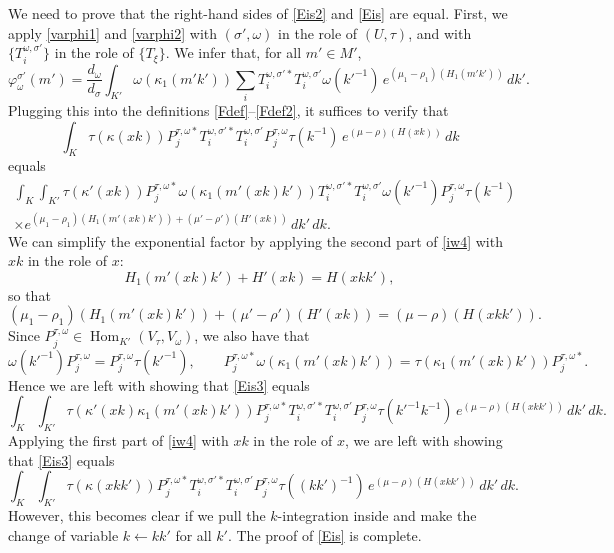 \documentclass[11pt,oneside]{amsart}
\numberwithin{equation}{section}
\theoremstyle{remark}
\theoremstyle{plain}
\DeclareMathOperator{\Hom}{Hom}
\begin{document}
We need to prove that the right-hand sides of \eqref{Eis2} and \eqref{Eis} are equal. First, we apply \eqref{varphi1} and \eqref{varphi2} with $(\sigma',\omega)$ in the role of $(U,\tau)$, and with $\{T_i^{\omega,\sigma'}\}$ in the role of $\{T_\xi\}$. We infer that, for all $m'\in M'$,
\[\varphi_\omega^{\sigma'}(m')=\frac{d_\omega}{d_\sigma}\int_{K'}\omega(\kappa_1(m'k'))
\sum_i T_i^{\omega,\sigma'*}T_i^{\omega,\sigma'}\omega(k'^{-1})\,e^{(\mu_1-\rho_1)(H_1(m'k'))}\,dk'.\]
Plugging this into the definitions \eqref{Fdef}--\eqref{Fdef2}, it suffices to verify that
\begin{equation}\label{Eis3}
\int_K\tau(\kappa(xk))P_j^{\tau,\omega*}T_i^{\omega,\sigma'*}T_i^{\omega,\sigma'}P_j^{\tau,\omega}
\tau(k^{-1})\,e^{(\mu-\rho)(H(xk))}\,dk
\end{equation}
equals
\begin{multline*}\int_K\int_{K'}\tau(\kappa'(xk))P_j^{\tau,\omega*}\omega(\kappa_1(m'(xk)k'))T_i^{\omega,\sigma'*}T_i^{\omega,\sigma'}
\omega(k'^{-1})P_j^{\tau,\omega}\tau(k^{-1})\\
\times e^{(\mu_1-\rho_1)(H_1(m'(xk)k'))+(\mu'-\rho')(H'(xk))}\,dk'\,dk.
\end{multline*}
We can simplify the exponential factor by applying the second part of \eqref{iw4} with $xk$ in the role of $x$:
\[H_1(m'(xk)k')+H'(xk)=H(xkk'),\]
so that
\[(\mu_1-\rho_1)(H_1(m'(xk)k'))+(\mu'-\rho')(H'(xk))=(\mu-\rho)(H(xkk')).\]
Since $P_j^{\tau,\omega}\in\Hom_{K'}(V_\tau,V_\omega)$, we also have that
\[\omega(k'^{-1})P_j^{\tau,\omega}=P_j^{\tau,\omega}\tau(k'^{-1}),\qquad
P_j^{\tau,\omega*}\omega(\kappa_1(m'(xk)k'))=\tau(\kappa_1(m'(xk)k'))P_j^{\tau,\omega*}.\]
Hence we are left with showing that \eqref{Eis3} equals
\[\int_K\int_{K'}\tau(\kappa'(xk)\kappa_1(m'(xk)k'))P_j^{\tau,\omega*}T_i^{\omega,\sigma'*}T_i^{\omega,\sigma'}
P_j^{\tau,\omega}\tau(k'^{-1}k^{-1})\,e^{(\mu-\rho)(H(xkk'))}\,dk'\,dk.\]
Applying the first part of \eqref{iw4} with $xk$ in the role of $x$, we are left with showing that \eqref{Eis3} equals
\[\int_K\int_{K'}\tau(\kappa(xkk'))P_j^{\tau,\omega*}T_i^{\omega,\sigma'*}T_i^{\omega,\sigma'}
P_j^{\tau,\omega}\tau((kk')^{-1})\,e^{(\mu-\rho)(H(xkk'))}\,dk'\,dk.\]
However, this becomes clear if we pull the $k$-integration inside and make the change of variable $k\leftarrow kk'$
for all $k'$. The proof of \eqref{Eis} is complete.
\end{document}
